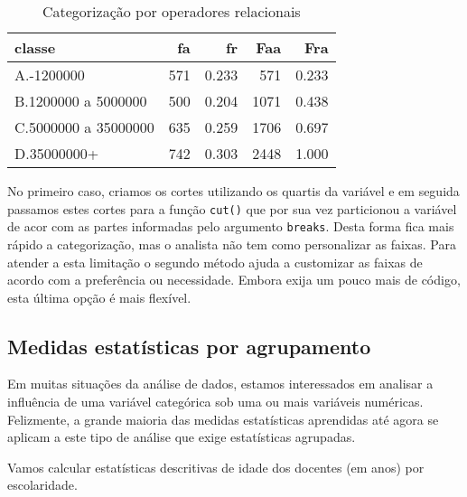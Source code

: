 \documentclass[11pt,]{style/krantz}
\theoremstyle{definition}
\theoremstyle{definition}
\theoremstyle{definition}
\theoremstyle{remark}
\let\BeginKnitrBlock\begin \let\EndKnitrBlock\end
\begin{document}
\begin{table}[!h]

\caption{\label{tab:tab09}Categorização por operadores relacionais}
\centering
\begin{tabular}{lrrrr}
\toprule
classe & fa & fr & Faa & Fra\\
\midrule
A.-1200000 & 571 & 0.233 & 571 & 0.233\\
B.1200000 a 5000000 & 500 & 0.204 & 1071 & 0.438\\
C.5000000 a 35000000 & 635 & 0.259 & 1706 & 0.697\\
D.35000000+ & 742 & 0.303 & 2448 & 1.000\\
\bottomrule
\end{tabular}
\end{table}

No primeiro caso, criamos os cortes utilizando os quartis da variável e em seguida passamos estes cortes para a função \texttt{cut()} que por sua vez particionou a variável de acor com as partes informadas pelo argumento \texttt{breaks}. Desta forma fica mais rápido a categorização, mas o analista não tem como personalizar as faixas. Para atender a esta limitação o segundo método ajuda a customizar as faixas de acordo com a preferência ou necessidade. Embora exija um pouco mais de código, esta última opção é mais flexível.

\hypertarget{medidas-estatisticas-por-agrupamento}{%
\subsection{Medidas estatísticas por agrupamento}\label{medidas-estatisticas-por-agrupamento}}

Em muitas situações da análise de dados, estamos interessados em analisar a influência de uma variável categórica sob uma ou mais variáveis numéricas. Felizmente, a grande maioria das medidas estatísticas aprendidas até agora se aplicam a este tipo de análise que exige estatísticas agrupadas.

\BeginKnitrBlock{example}
\protect\hypertarget{exm:unnamed-chunk-81}{}{\label{exm:unnamed-chunk-81} }Vamos calcular estatísticas descritivas de idade dos docentes (em anos) por escolaridade.
\EndKnitrBlock{example}
\end{document}
